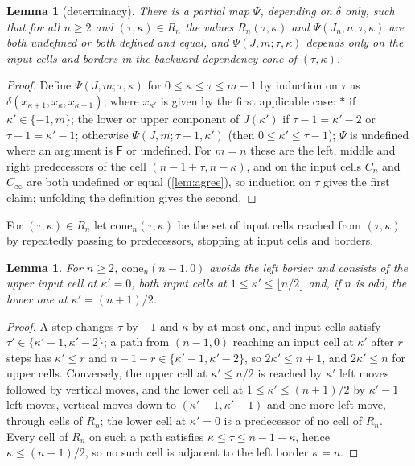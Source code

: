\documentclass[3p]{elsarticle}
\newtheorem{lemma}[theorem]{Lemma}
\theoremstyle{definition}
\newcommand{\Fq}{\mathsf F}
\begin{document}
\begin{lemma}[determinacy]\label{lem:determinacy}
There is a partial map $\Psi$, depending on $\delta$ only, such that for all
$n\ge2$ and $(\tau,\kappa)\in R_n$ the values $R_n(\tau,\kappa)$ and
$\Psi(J_n,n;\tau,\kappa)$ are both undefined or both defined and equal, and
$\Psi(J,m;\tau,\kappa)$ depends only on the input cells and borders in the
backward dependency cone of $(\tau,\kappa)$.
\end{lemma}

\begin{proof}
Define $\Psi(J,m;\tau,\kappa)$ for $0\le\kappa\le\tau\le m-1$ by induction on
$\tau$ as $\delta(x_{\kappa+1},x_\kappa,x_{\kappa-1})$, where $x_{\kappa'}$ is
given by the first applicable case: $\ast$ if $\kappa'\in\{-1,m\}$; the lower
or upper component of $J(\kappa')$ if $\tau-1=\kappa'-2$ or
$\tau-1=\kappa'-1$; otherwise $\Psi(J,m;\tau-1,\kappa')$ (then
$0\le\kappa'\le\tau-1$); $\Psi$ is undefined where an argument is $\Fq$ or
undefined. For $m=n$ these are the left, middle and right predecessors of the
cell $(n-1+\tau,n-\kappa)$, and on the input cells $C_n$ and $C_\infty$ are
both undefined or equal (\cref{lem:agree}), so induction on $\tau$ gives the
first claim; unfolding the definition gives the second.
\end{proof}

For $(\tau,\kappa)\in R_n$ let $\mathrm{cone}_n(\tau,\kappa)$ be the set of
input cells reached from $(\tau,\kappa)$ by repeatedly passing to
predecessors, stopping at input cells and borders.

\begin{lemma}\label{lem:cone}
For $n\ge2$, $\mathrm{cone}_n(n-1,0)$ avoids the left border and consists of
the upper input cell at $\kappa'=0$, both input cells at
$1\le\kappa'\le\lfloor n/2\rfloor$ and, if $n$ is odd, the lower one at
$\kappa'=(n+1)/2$.
\end{lemma}

\begin{proof}
A step changes $\tau$ by $-1$ and $\kappa$ by at most one, and input cells
satisfy $\tau'\in\{\kappa'-1,\kappa'-2\}$; a path from $(n-1,0)$ reaching an
input cell at $\kappa'$ after $r$ steps has $\kappa'\le r$ and
$n-1-r\in\{\kappa'-1,\kappa'-2\}$, so $2\kappa'\le n+1$, and $2\kappa'\le n$
for upper cells. Conversely, the upper cell at $\kappa'\le n/2$ is reached by
$\kappa'$ left moves followed by vertical moves, and the lower cell at
$1\le\kappa'\le(n+1)/2$ by $\kappa'-1$ left moves, vertical moves down to
$(\kappa'-1,\kappa'-1)$ and one more left move, through cells of $R_n$; the
lower cell at $\kappa'=0$ is a predecessor of no cell of $R_n$. Every cell of
$R_n$ on such a path satisfies $\kappa\le\tau\le n-1-\kappa$, hence
$\kappa\le(n-1)/2$, so no such cell is adjacent to the left border
$\kappa=n$.
\end{proof}
\end{document}
